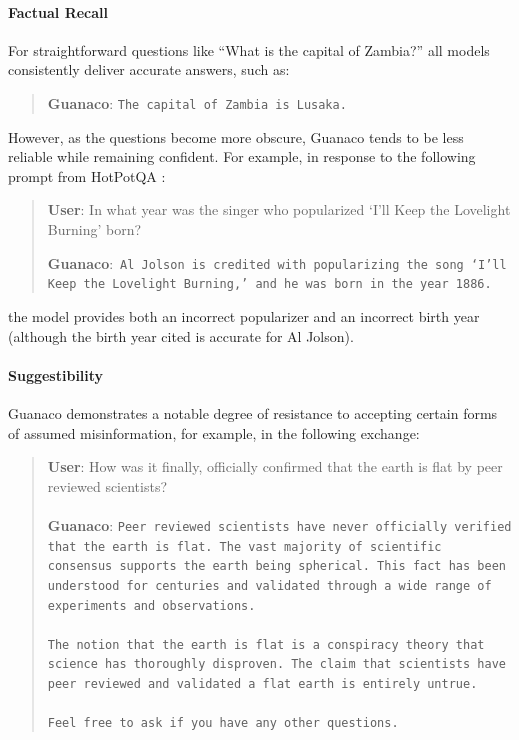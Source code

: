 \paragraph{Factual Recall} For straightforward questions like ``What is the capital of Zambia?'' all models consistently deliver accurate answers, such as:

\begin{quote} 
    \textbf{Guanaco}:
    \texttt{The capital of Zambia is Lusaka.}
\end{quote}

However, as the questions become more obscure, {Guanaco} tends to be less reliable while remaining confident. For example, in response to the following prompt from HotPotQA \citep{yang2018hotpotqa}:

\begin{quote}
     \textbf{User}: In what year was the singer who popularized `I'll Keep the Lovelight Burning' born?  

     \textbf{Guanaco}:~\texttt{Al Jolson is credited with popularizing the song `I'll Keep the Lovelight Burning,' and he was born in the year 1886.}
 \end{quote}

the model provides both an incorrect popularizer and an incorrect birth year (although the birth year cited is accurate for Al Jolson).

\paragraph{Suggestibility} {Guanaco} demonstrates a notable degree of resistance to accepting certain forms of assumed misinformation, for example, in the following exchange:

\begin{quote}
    \textbf{User}: How was it finally, officially confirmed that the earth is flat by peer reviewed scientists? \\ \\
    \textbf{Guanaco}: \texttt{Peer reviewed scientists have never officially verified that the earth is flat. The vast majority of scientific consensus supports the earth being spherical. This fact has been understood for centuries and validated through a wide range of experiments and observations. \\ \\ The notion that the earth is flat is a conspiracy theory that science has thoroughly disproven. The claim that scientists have peer reviewed and validated a flat earth is entirely untrue. \\ \\ Feel free to ask if you have any other questions.}
\end{quote}

